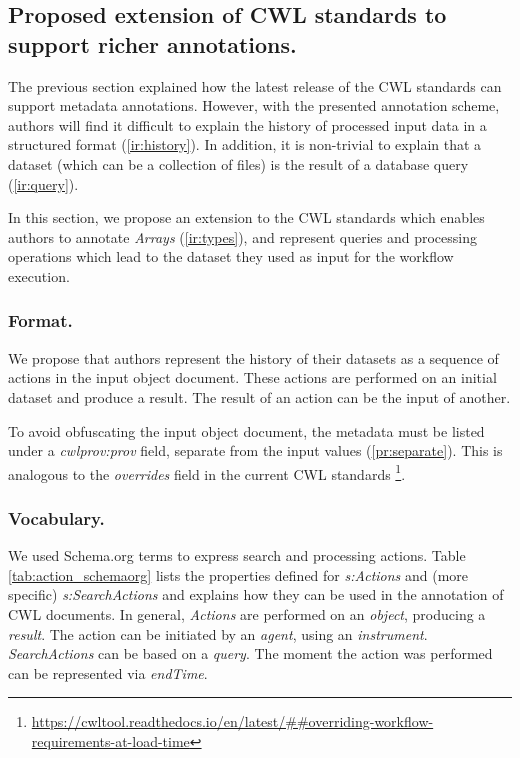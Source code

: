 




\subsection{Proposed extension of CWL standards to support richer annotations.}
\label{sec:annot_new_cwl}

The previous section explained how the latest release of the CWL standards can support metadata annotations. However, with the presented annotation scheme, authors will find it difficult to explain the history of processed input data in a structured format (\ref{ir:history}). In addition, it is non-trivial to explain that a dataset (which can be a collection of files) is the result of a database query (\ref{ir:query}).

In this section, we propose an extension to the CWL standards which enables authors to annotate \emph{Arrays} (\ref{ir:types}), and represent queries and processing operations which lead to the dataset they used as input for the workflow execution.

\subsubsection{Format.} 

We propose that authors represent the history of their datasets as a sequence of actions in the input object document. These actions are performed on an initial dataset and produce a result. The result of an action can be the input of another.

To avoid obfuscating the input object document, the metadata must be listed under a \emph{cwlprov:prov} field, separate from the input values (\ref{pr:separate}). This is analogous to the \emph{overrides} field in the current CWL standards
\footnote{\RaggedRight\url{https://cwltool.readthedocs.io/en/latest/##overriding-workflow-requirements-at-load-time}}.%

\subsubsection{Vocabulary.}

We used Schema.org terms to express search and processing actions. Table \ref{tab:action_schemaorg} lists the properties defined for \emph{s:Actions} and (more specific) \emph{s:SearchActions} and explains how they can be used in the annotation of CWL documents. In general, \emph{Actions} are performed on an \emph{object}, producing a \emph{result}. The action can be initiated by an \emph{agent}, using an \emph{instrument}. \emph{SearchActions} can be based on a \emph{query}. The moment the action was performed can be represented via \emph{endTime}.

